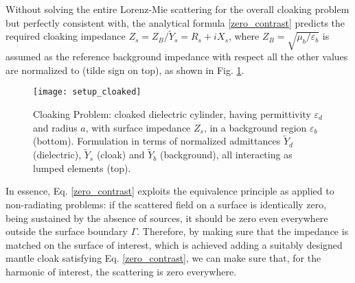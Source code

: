 \documentclass[reprint, showpacs, amsmath,amssymb, aps,
prb]{revtex4-1}
\begin{document}
Without solving the entire Lorenz-Mie scattering for the overall cloaking problem \cite{MC,Patt_Meta} but perfectly consistent with, the analytical formula \eqref{zero_contrast} predicts the required cloaking impedance $Z_s=Z_{B}/\widetilde{Y}_s=R_s+iX_s$, where $Z_{B}=\sqrt{\mu_b/\varepsilon_b}$ is assumed as the reference background impedance with respect all the other values are normalized to (tilde sign on top), as shown in Fig. \ref{fig:cases}. 
%
\begin{figure}[ht!]
\centering
\texttt{[image: setup\_cloaked]}
\caption{\small Cloaking Problem: cloaked dielectric cylinder, having permittivity $\varepsilon_d$ and radius $a$, with surface impedance $Z_s$, in a background region $\varepsilon_b$ (bottom). Formulation in terms of normalized admittances $\widetilde{Y}_d$ (dielectric), $\widetilde{Y}_s$ (cloak) and $\widetilde{Y}_b$ (background), all interacting as lumped elements (top).}
\label{fig:cases}
\end{figure}
%

In essence, Eq. \eqref{zero_contrast} exploits the equivalence principle as applied to non-radiating problems: if the scattered field on a surface is identically zero, being  sustained by the absence of sources, it should be zero even everywhere outside the surface boundary $\Gamma$. Therefore, by making sure that the impedance is matched on the surface of interest, which is achieved adding a suitably designed mantle cloak satisfying Eq. \eqref{zero_contrast}, we can make sure that, for the harmonic of interest, the scattering is zero everywhere.
\end{document}
